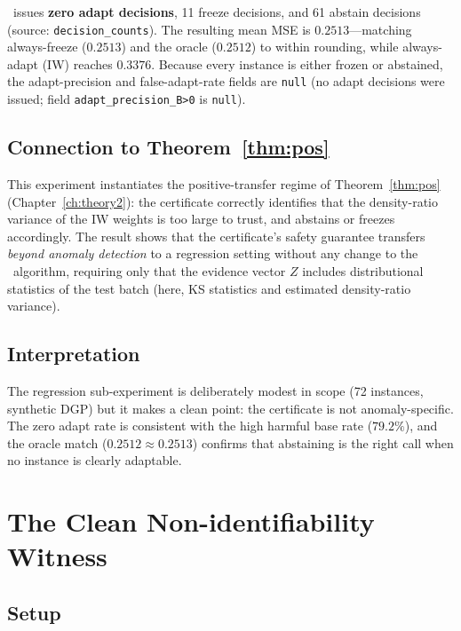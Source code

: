 \KGA\ issues \textbf{zero adapt decisions}, 11 freeze decisions, and 61 abstain decisions
(source: \texttt{decision\_counts}).  The resulting mean MSE is $0.2513$---matching
always-freeze ($0.2513$) and the oracle ($0.2512$) to within rounding, while always-adapt
(IW) reaches $0.3376$.  Because every instance is either frozen or abstained, the
adapt-precision and false-adapt-rate fields are \texttt{null} (no adapt decisions were
issued; field \texttt{adapt\_precision\_B>0} is \texttt{null}).

\subsection{Connection to Theorem~\ref{thm:pos}}

This experiment instantiates the positive-transfer regime of Theorem~\ref{thm:pos}
(Chapter~\ref{ch:theory2}): the certificate correctly identifies that the density-ratio
variance of the IW weights is too large to trust, and abstains or freezes accordingly.
The result shows that the certificate's safety guarantee transfers \emph{beyond anomaly
detection} to a regression setting without any change to the \KGA\ algorithm, requiring
only that the evidence vector $Z$ includes distributional statistics of the test batch
(here, KS statistics and estimated density-ratio variance).

\subsection{Interpretation}

The regression sub-experiment is deliberately modest in scope (72 instances, synthetic
DGP) but it makes a clean point: the certificate is not anomaly-specific.  The zero
adapt rate is consistent with the high harmful base rate ($79.2\%$), and the oracle match
($0.2512 \approx 0.2513$) confirms that abstaining is the right call when no instance
is clearly adaptable.

\section{The Clean Non-identifiability Witness}
\label{sec:exp1-witness}

\subsection{Setup}

